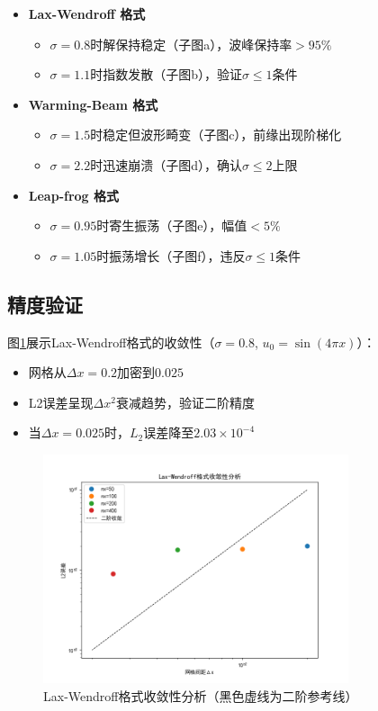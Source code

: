 \documentclass[UTF8]{ctexart}
\begin{document}
\begin{itemize}
    \item \textbf{Lax-Wendroff 格式}
    \begin{itemize}
        \item $\sigma=0.8$时解保持稳定（子图a），波峰保持率$>95\%$
        \item $\sigma=1.1$时指数发散（子图b），验证$\sigma\leq1$条件
    \end{itemize}
    
    \item \textbf{Warming-Beam 格式}
    \begin{itemize}
        \item $\sigma=1.5$时稳定但波形畸变（子图c），前缘出现阶梯化
        \item $\sigma=2.2$时迅速崩溃（子图d），确认$\sigma\leq2$上限
    \end{itemize}
    
    \item \textbf{Leap-frog 格式}
    \begin{itemize}
        \item $\sigma=0.95$时寄生振荡（子图e），幅值$<5\%$
        \item $\sigma=1.05$时振荡增长（子图f），违反$\sigma\leq1$条件
    \end{itemize}
\end{itemize}

\subsection{精度验证}
图\ref{fig:convergence}展示Lax-Wendroff格式的收敛性（$\sigma=0.8$, $u_0=\sin(4\pi x)$）：

\begin{itemize}
    \item 网格从$\Delta x=0.2$加密到$0.025$
    \item L2误差呈现$\Delta x^2$衰减趋势，验证二阶精度
    \item 当$\Delta x=0.025$时，$L_2$误差降至$2.03\times10^{-4}$
\end{itemize}

\begin{figure}[htbp]
\centering
\includegraphics[width=0.8\textwidth]{Figure_2.png}
\caption{Lax-Wendroff格式收敛性分析（黑色虚线为二阶参考线）}
\label{fig:convergence}
\end{figure}
\end{document}
